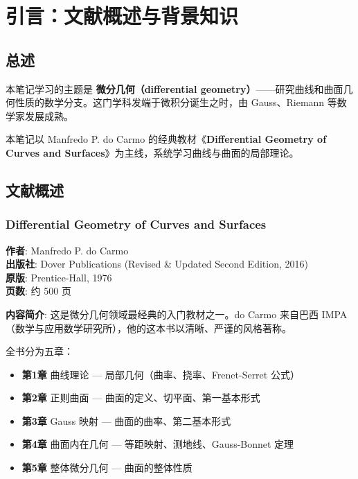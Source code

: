 
\chapter*{引言：文献概述与背景知识}
\label{chap:Intro}

\section{总述}

本笔记学习的主题是 \textbf{微分几何（differential geometry）}——研究曲线和曲面几何性质的数学分支。这门学科发端于微积分诞生之时，由 Gauss、Riemann 等数学家发展成熟。

本笔记以 Manfredo P. do Carmo 的经典教材《\textbf{Differential Geometry of Curves and Surfaces}》为主线，系统学习曲线与曲面的局部理论。

\section{文献概述}

\subsection*{Differential Geometry of Curves and Surfaces}
\textbf{作者}: Manfredo P. do Carmo \\
\textbf{出版社}: Dover Publications (Revised \& Updated Second Edition, 2016) \\
\textbf{原版}: Prentice-Hall, 1976 \\
\textbf{页数}: 约 500 页

\textbf{内容简介}:
这是微分几何领域最经典的入门教材之一。do Carmo 来自巴西 IMPA（数学与应用数学研究所），他的这本书以清晰、严谨的风格著称。

全书分为五章：
\begin{itemize}
\item \textbf{第1章} 曲线理论 — 局部几何（曲率、挠率、Frenet-Serret 公式）
\item \textbf{第2章} 正则曲面 — 曲面的定义、切平面、第一基本形式
\item \textbf{第3章} Gauss 映射 — 曲面的曲率、第二基本形式
\item \textbf{第4章} 曲面内在几何 — 等距映射、测地线、Gauss-Bonnet 定理
\item \textbf{第5章} 整体微分几何 — 曲面的整体性质
\end{itemize}


